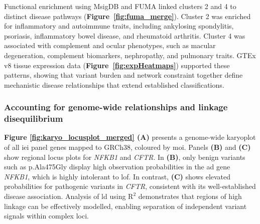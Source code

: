 Functional enrichment using MsigDB and FUMA \cite{watanabe_functional_2017} linked clusters 2 and 4 to distinct disease pathways (\textbf{Figure~\ref{fig:fuma_merge}}). Cluster 2 was enriched for inflammatory and autoimmune traits, including ankylosing spondylitis, psoriasis, inflammatory bowel disease, and rheumatoid arthritis. Cluster 4 was associated with complement and ocular phenotypes, such as macular degeneration, complement biomarkers, nephropathy, and pulmonary traits. GTEx v8 tissue expression data (\textbf{Figure~\ref{fig:expHeatmaps}}) supported these patterns, showing that variant burden and network constraint together define mechanistic disease relationships that extend established classifications.

\subsubsection*{Accounting for genome-wide relationships and linkage disequilibrium}

\textbf{Figure \ref{fig:karyo_locusplot_merged} (A)} presents a genome-wide karyoplot of all \ac{iei} panel genes mapped to GRCh38, coloured by \ac{moi}. 
Panels \textbf{(B)} and \textbf{(C)} show regional locus plots for \textit{NFKB1} and \textit{CFTR}. 
In \textbf{(B)}, only benign variants such as p.Ala475Gly display high observation probabilities in the \ac{ad} gene \textit{NFKB1}, which is highly intolerant to \ac{lof}. 
In contrast, \textbf{(C)} shows elevated probabilities for pathogenic variants in \textit{CFTR}, consistent with its well-established disease association. 
Analysis of \ac{ld} using $\text{R}^2$ demonstrates that regions of high linkage can be effectively modelled, enabling separation of independent variant signals within complex loci.


